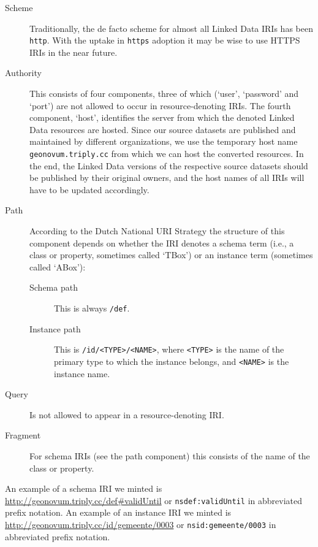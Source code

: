 \documentclass[a4paper]{scrartcl}
\newcommand{\textt}[1]{{\small \texttt{#1}}}
\begin{document}
\begin{description}

\item [Scheme] Traditionally, the de facto scheme for almost all
  Linked Data IRIs has been \textt{http}.  With the uptake in
  \textt{https} adoption it may be wise to use HTTPS IRIs in the near
  future.

\item [Authority] This consists of four components, three of which
  (`user', `password' and `port') are not allowed to occur in
  resource-denoting IRIs.  The fourth component, `host', identifies
  the server from which the denoted Linked Data resources are hosted.
  Since our source datasets are published and maintained by different
  organizations, we use the temporary host name
  \textt{geonovum.triply.cc} from which we can host the converted
  resources.  In the end, the Linked Data versions of the respective
  source datasets should be published by their original owners, and
  the host names of all IRIs will have to be updated accordingly.

\item [Path] According to the Dutch National URI Strategy the
  structure of this component depends on whether the IRI denotes a
  schema term (i.e., a class or property, sometimes called `TBox') or
  an instance term (sometimes called `ABox'):

  \begin{description}

  \item [Schema path] This is always \textt{/def}.

  \item [Instance path] This is \textt{/id/<TYPE>/<NAME>}, where
    \textt{<TYPE>} is the name of the primary type to which the
    instance belongs, and \textt{<NAME>} is the instance name.

  \end{description}

\item [Query] Is not allowed to appear in a resource-denoting IRI.

\item [Fragment] For schema IRIs (see the path component) this
  consists of the name of the class or property.

\end{description}

An example of a schema IRI we minted is
\url{http://geonovum.triply.cc/def#validUntil} or
\textt{nsdef:validUntil} in abbreviated prefix notation.  An example
of an instance IRI we minted is
\url{http://geonovum.triply.cc/id/gemeente/0003} or
\textt{nsid:gemeente/0003} in abbreviated prefix notation.
\end{document}
